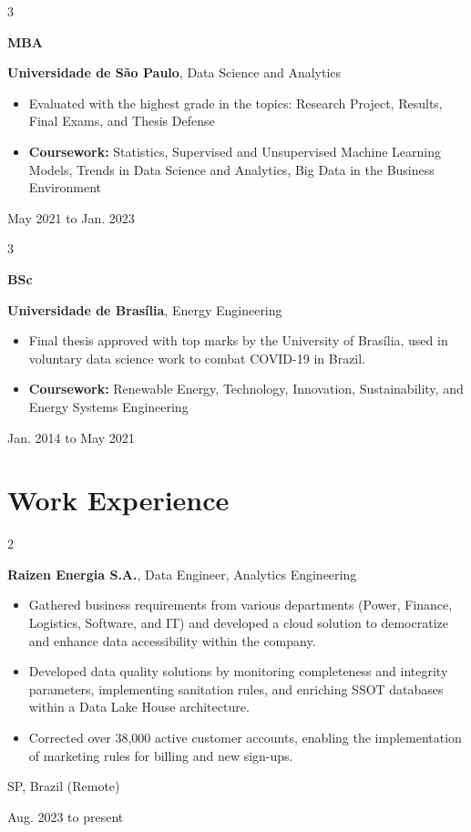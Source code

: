 \documentclass[10pt, letterpaper]{article}
\newenvironment{highlights}{
    \begin{itemize}[
        topsep=0.10 cm,
        parsep=0.10 cm,
        partopsep=0pt,
        itemsep=0pt,
        leftmargin=0.4 cm + 10pt
    ]
}{
    \end{itemize}
} %
\newenvironment{twocolentry}[2][]{
    \onecolentry
    \def\secondColumn{#2}
    \setcolumnwidth{\fill, 4.5 cm}
    \begin{paracol}{2}
}{
    \switchcolumn \raggedleft \secondColumn
    \end{paracol}
    \endonecolentry
} %
\newenvironment{threecolentry}[3][]{
    \onecolentry
    \def\thirdColumn{#3}
    \setcolumnwidth{1 cm, \fill, 4.5 cm}
    \begin{paracol}{3}
    {\raggedright #2} \switchcolumn
}{
    \switchcolumn \raggedleft \thirdColumn
    \end{paracol}
    \endonecolentry
} %
\begin{document}
        \vspace{0.2 cm}

        \begin{threecolentry}{\textbf{MBA}}{
            May 2021 to Jan. 2023
        }
            \textbf{Universidade de São Paulo}, Data Science and Analytics
            \begin{highlights}
                \item Evaluated with the highest grade in the topics: Research Project, Results, Final Exams, and Thesis Defense
                \item \textbf{Coursework:} Statistics, Supervised and Unsupervised Machine Learning Models, Trends in Data Science and Analytics, Big Data in the Business Environment
            \end{highlights}
        \end{threecolentry}

        \vspace{0.2 cm}

        \begin{threecolentry}{\textbf{BSc}}{
            Jan. 2014 to May 2021
        }
            \textbf{Universidade de Brasília}, Energy Engineering
            \begin{highlights}
                \item Final thesis approved with top marks by the University of Brasília, used in voluntary data science work to combat COVID-19 in Brazil.
                \item \textbf{Coursework:} Renewable Energy, Technology, Innovation, Sustainability, and Energy Systems Engineering
            \end{highlights}
        \end{threecolentry}


    
    \section{Work Experience}



        
        \begin{twocolentry}{
            SP, Brazil (Remote)

        Aug. 2023 to present
        }
            \textbf{Raizen Energia S.A.}, Data Engineer, Analytics Engineering
            \begin{highlights}
                \item Gathered business requirements from various departments (Power, Finance, Logistics, Software, and IT) and developed a cloud solution to democratize and enhance data accessibility within the company.
                \item Developed data quality solutions by monitoring completeness and integrity parameters, implementing sanitation rules, and enriching SSOT databases within a Data Lake House architecture.
                \item Corrected over 38,000 active customer accounts, enabling the implementation of marketing rules for billing and new sign-ups.
            \end{highlights}
        \end{twocolentry}
\end{document}
